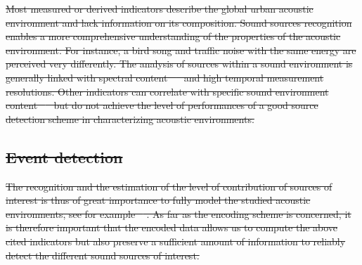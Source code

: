 \documentclass[sensors,article,submit,moreauthors,pdftex,10pt,a4paper]{mdpi}
\providecommand{\DIFdeltex}[1]{{\protect\color{red}\sout{#1}}}                      %
\providecommand{\DIFdel}[1]{\texorpdfstring{\DIFdeltex{#1}}{}} %
\begin{document}
\DIFdel{Most measured or derived indicators describe the global urban acoustic environment and lack information on its composition. Sound sources recognition enables a more comprehensive understanding of the properties of the acoustic environment. For instance, a bird song and traffic noise with the same energy are perceived very differently. The analysis of sources within a sound environment is generally linked with spectral content \mbox{%
\cite{ishiyama2000} }\hspace{0pt}%
and high temporal measurement resolutions. Other indicators can correlate with specific sound environment content \mbox{%
\cite{aumond2017} }\hspace{0pt}%
but do not achieve the level of performances of a good source detection scheme in characterizing acoustic environments.
}%

\subsection{\DIFdel{Event detection}}
\addtocounter{subsection}{-1}%

\DIFdel{The recognition and the estimation of the level of contribution of sources of interest is thus of great importance to fully model the studied acoustic environments, see for example \mbox{%
\cite{alsina2016design, app7020146, gloaguen2016estimating}}\hspace{0pt}%
. As far as the encoding scheme is concerned, it is therefore important that the encoded data allows us to compute the above cited indicators but also preserve a sufficient amount of information to reliably detect the different sound sources of interest.
}%
\end{document}

